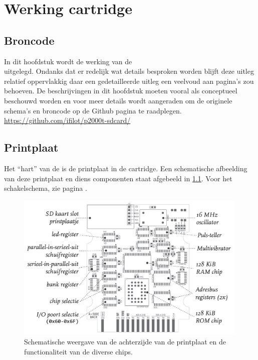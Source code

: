 \chapter{Werking cartridge}
\chapterpreamble

\section{Broncode}

In dit hoofdstuk wordt de werking van de \product \\uitgelegd. Ondanks dat er redelijk wat details besproken worden blijft deze uitleg relatief oppervlakkig daar een gedetailleerde uitleg een veelvoud aan pagina's zou behoeven. De beschrijvingen in dit hoofdstuk moeten vooral als conceptueel beschouwd worden en voor meer details wordt aangeraden om de originele schema's en broncode op de Github pagina te raadplegen.\\
\faGithub \; \url{https://github.com/ifilot/p2000t-sdcard/}

%
%
%
\section{Printplaat}


Het ``hart'' van de \product is de printplaat in de  cartridge. Een schematische afbeelding van deze printplaat en diens componenten staat afgebeeld in \cref{fig:pcb-design}. Voor het schakelschema, zie pagina \pageref{sec:schematic-cartridge2}.

\begin{figure}[h!]
    \centering
    \includegraphics[width=0.99\textwidth]{img/pcb-design}
    \caption{Schematische weergave van de achterzijde van de printplaat en de functionaliteit van de diverse chips.}
    \label{fig:pcb-design}
\end{figure}

